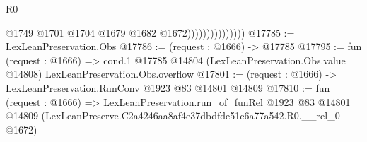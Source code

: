 \begin{lexlean}{R0}
\begin{coremodule}
                                  @1749
                                  @1701
                                  @1704
                                  @1679
                                  @1682
                                  @1672)))))))))))))))
@17785 := LexLeanPreservation.Obs
@17786 := (request : @1666) -> @17785
@17795 := fun (request : @1666) =>
  cond.{1} @17785 @14804 (LexLeanPreservation.Obs.value @14808) LexLeanPreservation.Obs.overflow
@17801 := (request : @1666) -> LexLeanPreservation.RunConv @1923 @83 @14801 @14809
@17810 := fun (request : @1666) =>
  LexLeanPreservation.run_of_funRel
    @1923
    @83
    @14801
    @14809
    (LexLeanPreserve.C2a4246aa8af4e37dbdfde51c6a77a542.R0.__rel_0 @1672)
\end{coremodule}
\end{lexlean}
